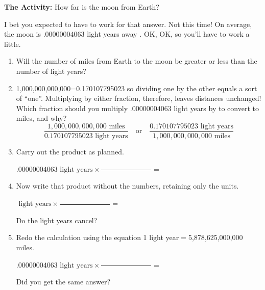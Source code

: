 \bigskip\noindent\textbf{The Activity:} How far is the moon from Earth?

\smallskip\noindent{}I bet you expected to have to work for that answer. Not this time! On average, the moon is $.00000004063$ light years away . OK, OK, so you'll have to work a little. 
\begin{enumerate}
\item Will the number of miles from Earth to the moon be greater or less than the number of light years? \wbvfill
\item 1,000,000,000,000=0.170107795023 so dividing one by the other equals a sort of ``one''. Multiplying by either fraction, therefore, leaves distances unchanged! Which fraction should you multiply $.00000004063$ light years by to convert to miles, and why?
\[
\frac{1,000,000,000,000\text{ miles}}{0.170107795023\text{ light years}}\quad\text{or}\quad \frac{0.170107795023\text{ light years}}{1,000,000,000,000\text{ miles}}
\]
\wbvfill
\item Carry out the product as planned.\par\medskip
$.00000004063\text{ light years}\times\frac{\qquad\qquad\qquad\qquad\qquad}{\qquad\qquad\qquad\qquad\qquad}=$\par\medskip
\item Now write that product without the numbers, retaining only the units.\par\medskip
$\text{ light years}\times\frac{\qquad\qquad\qquad\qquad\qquad}{\qquad\qquad\qquad\qquad\qquad}=$\par\medskip
Do the light years cancel?
\item Redo the calculation using the equation 1 light year$=$5,878,625,000,000 miles.\par\medskip
$.00000004063\text{ light years}\times\frac{\qquad\qquad\qquad\qquad\qquad}{\qquad\qquad\qquad\qquad\qquad}=$\par\medskip
Did you get the same answer? \wbnewpage
\end{enumerate}

